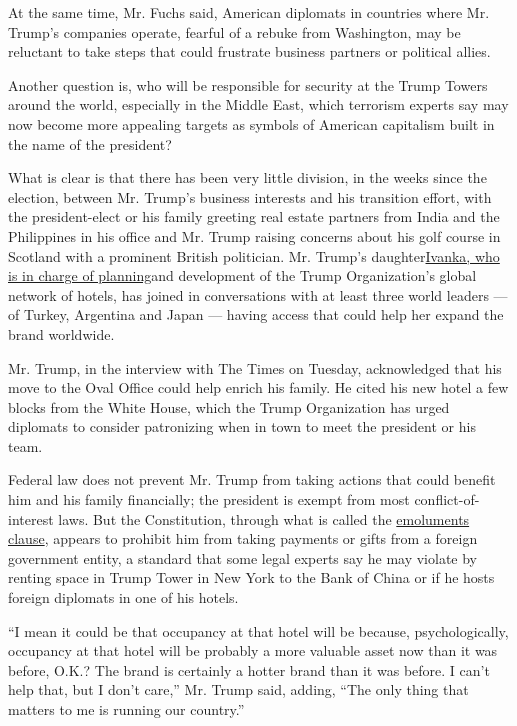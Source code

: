 At the same time, Mr. Fuchs said, American diplomats in countries where
Mr. Trump's companies operate, fearful of a rebuke from Washington, may
be reluctant to take steps that could frustrate business partners or
political allies.

Another question is, who will be responsible for security at the Trump
Towers around the world, especially in the Middle East, which terrorism
experts say may now become more appealing targets as symbols of American
capitalism built in the name of the president?

What is clear is that there has been very little division, in the weeks
since the election, between Mr. Trump's business interests and his
transition effort, with the president-elect or his family greeting real
estate partners from India and the Philippines in his office and Mr.
Trump raising concerns about his golf course in Scotland with a
prominent British politician. Mr. Trump's
daughter\href{http://www.trump.com/the-next-generation/ivanka-trump/}{Ivanka,
who is in charge of planning}and development of the Trump Organization's
global network of hotels, has joined in conversations with at least
three world leaders --- of Turkey, Argentina and Japan --- having access
that could help her expand the brand worldwide.

Mr. Trump, in the interview with The Times on Tuesday, acknowledged that
his move to the Oval Office could help enrich his family. He cited his
new hotel a few blocks from the White House, which the Trump
Organization has urged diplomats to consider patronizing when in town to
meet the president or his team.

Federal law does not prevent Mr. Trump from taking actions that could
benefit him and his family financially; the president is exempt from
most conflict-of-interest laws. But the Constitution, through what is
called the
\href{http://www.nytimes.com/2016/11/21/us/politics/donald-trump-conflict-of-interest.html}{emoluments
clause}, appears to prohibit him from taking payments or gifts from a
foreign government entity, a standard that some legal experts say he may
violate by renting space in Trump Tower in New York to the Bank of China
or if he hosts foreign diplomats in one of his hotels.

``I mean it could be that occupancy at that hotel will be because,
psychologically, occupancy at that hotel will be probably a more
valuable asset now than it was before, O.K.? The brand is certainly a
hotter brand than it was before. I can't help that, but I don't care,''
Mr. Trump said, adding, ``The only thing that matters to me is running
our country.''

